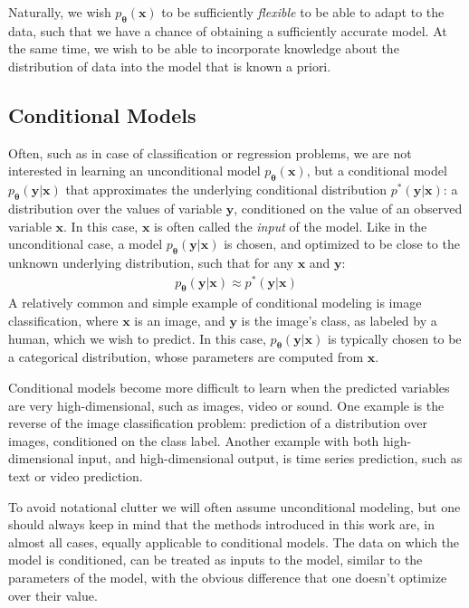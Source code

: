 \documentclass[MAL,biber]{nowfnt} %
\newcommand{\bb}[1]{\mathbf{#1}}
\newcommand{\bx}{\bb{x}}
\newcommand{\by}{\bb{y}}
\newcommand{\bT}{\boldsymbol{\theta}}
\newcommand{\pT}{p_{\bT}}
\begin{document}
Naturally, we wish $\pT(\bx)$ to be sufficiently \emph{flexible} to be able to adapt to the data, such that we have a chance of obtaining a sufficiently accurate model. At the same time, we wish to be able to incorporate knowledge about the distribution of data into the model that is known a priori.

\subsection{Conditional Models}

Often, such as in case of classification or regression problems, we are not interested in learning an unconditional model $\pT(\bx)$, but a conditional model $\pT(\by|\bx)$ that approximates the underlying conditional distribution $p^*(\by|\bx)$: a distribution over the values of variable $\by$, conditioned on the value of an observed variable $\bx$. In this case, $\bx$ is often called the \emph{input} of the model.
Like in the unconditional case, a model $\pT(\by|\bx)$ is chosen, and optimized to be close to the unknown underlying distribution, such that for any $\bx$ and $\by$:
\begin{align}
\pT(\by|\bx) \approx p^*(\by|\bx)
\end{align}
A relatively common and simple example of conditional modeling is image classification, where $\bx$ is an image, and $\by$ is the image's class, as labeled by a human, which we wish to predict. In this case, $\pT(\by|\bx)$ is typically chosen to be a categorical distribution, whose parameters are computed from $\bx$.

Conditional models become more difficult to learn when the predicted variables are very high-dimensional, such as images, video or sound. One example is the reverse of the image classification problem: prediction of a distribution over images, conditioned on the class label. Another example with both high-dimensional input, and high-dimensional output, is time series prediction, such as text or video prediction.

To avoid notational clutter we will often assume unconditional modeling, but one should always keep in mind that the methods introduced in this work are, in almost all cases, equally applicable to conditional models. The data on which the model is conditioned, can be treated as inputs to the model, similar to the parameters of the model, with the obvious difference that one doesn't optimize over their value.
\end{document}

